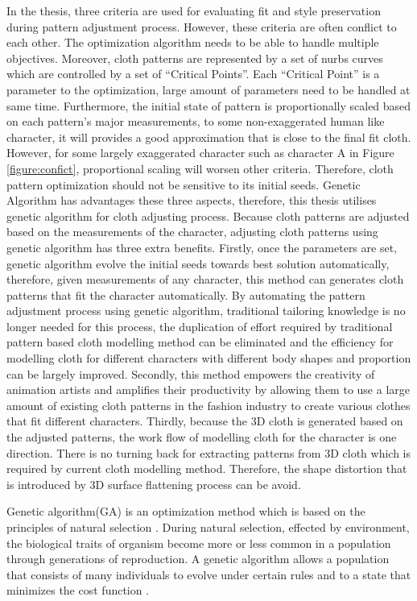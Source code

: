 In the thesis, three criteria are used for evaluating fit and style preservation during pattern adjustment process. However, these criteria are often conflict to each other. The optimization algorithm needs to be able to handle multiple objectives. Moreover, cloth patterns are represented by a set of nurbs curves which are controlled by a set of ``Critical Points''. Each ``Critical Point'' is a parameter to the optimization, large amount of parameters need to be handled at same time. Furthermore, the initial state of pattern is proportionally scaled based on each pattern's major measurements, to some non-exaggerated human like character, it will provides a good approximation that is close to the final fit cloth. However, for some largely exaggerated character such as character A in Figure \ref{figure:confict}, proportional scaling will worsen other criteria. Therefore, cloth pattern optimization should not be sensitive to its initial seeds. Genetic Algorithm has advantages these three aspects, therefore, this thesis utilises genetic algorithm for cloth adjusting process. Because cloth patterns are adjusted based on the measurements of the character, adjusting cloth patterns using genetic algorithm has three extra benefits. Firstly, once the parameters are set, genetic algorithm evolve the initial seeds towards best solution automatically, therefore, given measurements of any character, this method can generates cloth patterns that fit the character automatically. By automating the pattern adjustment process using genetic algorithm, traditional tailoring knowledge is no longer needed for this process, the duplication of effort required by traditional pattern based cloth modelling method can be eliminated and the efficiency for modelling cloth for different characters with different body shapes and proportion can be largely improved. Secondly, this method empowers the creativity of animation artists and amplifies their productivity by allowing them to use a large amount of existing cloth patterns in the fashion industry to create various clothes that fit different characters. Thirdly, because the 3D cloth is generated based on the adjusted patterns, the work flow of modelling cloth for the character is one direction. There is no turning back for extracting patterns from 3D cloth which is required by current cloth modelling method. Therefore, the shape distortion that is introduced by 3D surface flattening process can be avoid. 

Genetic algorithm(GA) is an optimization method which is based on the principles of natural selection . During natural selection, effected by environment, the biological traits of organism become more or less common in a population through generations of reproduction. A genetic algorithm allows a population that consists of many individuals to evolve under certain rules and to a state that minimizes the cost function . 

